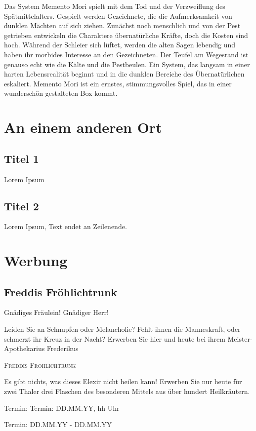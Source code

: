 \documentclass[final]{multiversum}
\begin{document}
Das System Memento Mori spielt mit dem Tod und der Verzweiflung des Spätmittelalters.
Gespielt werden Gezeichnete, die die Aufmerksamkeit von dunklen Mächten auf sich ziehen.
Zunächst noch menschlich und von der Pest getrieben entwickeln die Charaktere übernatürliche Kräfte, doch die Kosten sind hoch.
Während der Schleier sich lüftet, werden die alten Sagen lebendig und haben ihr morbides Interesse an den Gezeichneten.
Der Teufel am Wegesrand ist genauso echt wie die Kälte und die Pestbeulen.
Ein System, das langsam in einer harten Lebensrealität beginnt und in die dunklen Bereiche des Übernatürlichen eskaliert.
Memento Mori ist ein ernstes, stimmungsvolles Spiel, das in einer wunderschön gestalteten Box kommt.

\section{An einem anderen Ort}

\subsection{Titel 1}
Lorem Ipsum

\subsection{Titel 2}
Lorem Ipsum, Text endet an Zeilenende.

\section{Werbung}
\subsection{Freddis Fröhlichtrunk}
Gnädiges Fräulein! Gnädiger Herr!  

Leiden Sie an Schnupfen oder Melancholie? Fehlt ihnen die Manneskraft, oder schmerzt ihr Kreuz in der Nacht? Erwerben Sie hier und heute bei ihrem Meister-Apothekarius Frederikus

\begin{center}\textsc{Freddis Fröhlichtrunk}\end{center}

Es gibt nichts, was dieses Elexir nicht heilen kann! Erwerben Sie nur heute für zwei Thaler drei Flaschen des besonderen Mittels aus über hundert Heilkräutern. 


\begin{termine}
\item Termin: Termin: DD.MM.YY, hh Uhr
  \item Termin: DD.MM.YY - DD.MM.YY
\end{termine}
\impressum
\end{document}
